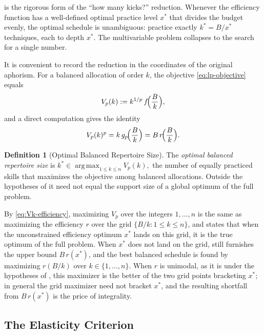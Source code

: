\documentclass[11pt]{article}
\theoremstyle{definition}
\newtheorem{definition}[theorem]{Definition}
\theoremstyle{remark}
\newcommand{\eff}{r}
\newcommand{\argmax}{\operatorname*{arg\,max}}
\begin{document}
 is the rigorous form of the ``how many kicks?''
reduction. Whenever the efficiency function has a well-defined optimal
practice level \(x^*\) that divides the budget evenly, the optimal schedule
is unambiguous: practice exactly \(k^*=B/x^*\) techniques, each to depth
\(x^*\). The multivariable problem collapses to the search for a single
number.

It is convenient to record the reduction in the coordinates of the original
aphorism. For a balanced allocation of order \(k\), the objective
\eqref{eq:lp-objective} equals
\begin{equation}
    V_p(k)
    :=
    k^{1/p}\,f\!\Bigl(\frac{B}{k}\Bigr),
    \label{eq:Vk}
\end{equation}
and a direct computation gives the identity
\begin{equation}
    V_p(k)^p
    =
    k\,g_p\!\Bigl(\frac{B}{k}\Bigr)
    =
    B\,\eff\!\Bigl(\frac{B}{k}\Bigr).
    \label{eq:Vk-efficiency}
\end{equation}

\begin{definition}[Optimal Balanced Repertoire Size]
\label{def:repertoire}
The \emph{optimal balanced repertoire size} is
\(
    k^*\in\argmax_{1\leq k\leq n} V_p(k),
\)
the number of equally practiced skills that maximizes the objective among
balanced allocations. Outside the hypotheses of  it
need not equal the support size of a global optimum of the full problem.
\end{definition}

By \eqref{eq:Vk-efficiency}, maximizing \(V_p\) over the integers
\(1,\ldots,n\) is the same as maximizing the efficiency \(\eff\) over the
grid \(\{B/k:1\leq k\leq n\}\), and  states that when
the unconstrained efficiency optimum \(x^*\) lands on this grid, it is the
true optimum of the full problem. When \(x^*\) does not land on the grid,
 still furnishes the upper bound
\(B\,\eff(x^*)\), and the best balanced schedule is found by maximizing
\(\eff(B/k)\) over \(k\in\{1,\ldots,n\}\). When \(\eff\) is unimodal, as it
is under the hypotheses of , this maximizer
is the better of the two grid points bracketing \(x^*\); in general the grid
maximizer need not bracket \(x^*\), and the resulting shortfall from
\(B\,\eff(x^*)\) is the price of integrality.

\subsection{The Elasticity Criterion}
\label{subsec:elasticity}
\end{document}
